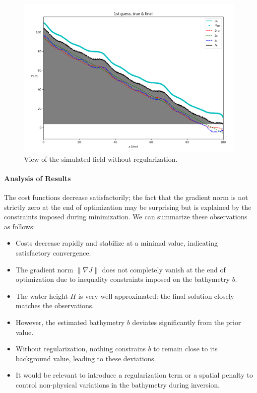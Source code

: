 \documentclass{article}
\begin{document}
\begin{figure}[H]
    \begin{minipage}[b]{0.55\linewidth}
        \centering
        \includegraphics[width=\linewidth]{Images_Ayoub/No_Regularisation/View.png}
        \caption{View of the simulated field without regularization.}
        \label{fig:view}
    \end{minipage}
\end{figure}

\paragraph{Analysis of Results}
The cost functions decrease satisfactorily; the fact that the gradient norm is not strictly zero at the end of optimization may be surprising but is explained by the constraints imposed during minimization. We can summarize these observations as follows:

\begin{itemize}
  \item Costs decrease rapidly and stabilize at a minimal value, indicating satisfactory convergence.
  \item The gradient norm \( \|\nabla J\| \) does not completely vanish at the end of optimization due to inequality constraints imposed on the bathymetry \( b \).
  \item The water height \( H \) is very well approximated: the final solution closely matches the observations.
  \item However, the estimated bathymetry \( b \) deviates significantly from the prior value.
  \item Without regularization, nothing constrains \( b \) to remain close to its background value, leading to these deviations.
  \item It would be relevant to introduce a regularization term or a spatial penalty to control non-physical variations in the bathymetry during inversion.
\end{itemize}
\end{document}
